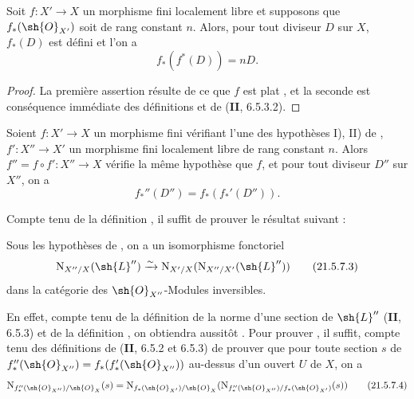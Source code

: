 \begin{proposition}[21.5.6]
\label{IV.21.5.6}
Soit $f:X'\to X$ un morphisme fini localement libre et supposons que $f_*(\sh{O}_{X'})$ soit de rang constant $n$.
Alors, pour tout diviseur $D$ sur $X$, $f_*(D)$ est défini et l'on a
\[
\label{IV.21.5.6.1}
  f_*(f^*(D))=nD.
  \tag{21.5.6.1}
\]
\end{proposition}

\begin{proof}
La première assertion résulte de ce que $f$ est plat , et la seconde est conséquence immédiate des définitions et de (\textbf{II}, 6.5.3.2).
\end{proof}

\begin{proposition}[21.5.7]
\label{IV.21.5.7}
Soient $f:X'\to X$ un morphisme fini vérifiant l'une des hypothèses \textup{I), II)} de , $f':X''\to X'$ un morphisme fini localement libre de rang constant $n$.
Alors $f''=f\circ f':X''\to X$ vérifie la même hypothèse que $f$, et pour tout diviseur $D''$ sur $X''$, on a
\[
\label{IV.21.5.7.1}
  f_*''(D'')=f_*(f_*'(D'')).
  \tag{21.5.7.1}
\]
\end{proposition}

Compte tenu de la définition , il suffit de prouver le résultat suivant :

\begin{lemma}[21.5.7.2]
\label{IV.21.5.7.2}
Sous les hypothèses de , on a un isomorphisme fonctoriel
\[
\label{IV.21.5.7.3}
  \mathrm{N}_{X''/X}(\sh{L}'')\xrightarrow{\sim}\mathrm{N}_{X'/X}(\mathrm{N}_{X''/X'}(\sh{L}''))
  \tag{21.5.7.3}
\]
dans la catégorie des $\sh{O}_{X''}$-Modules inversibles.
\end{lemma}

En effet, compte tenu de la définition de la norme d'une section de $\sh{L}''$ (\textbf{II}, 6.5.3) et de la définition , on obtiendra aussitôt .
Pour prouver , il suffit, compte tenu des définitions de (\textbf{II}, 6.5.2 et 6.5.3) de prouver que pour toute section $s$ de $f_*''(\sh{O}_{X''})=f_*(f_*'(\sh{O}_{X''}))$ au-dessus d'un ouvert $U$ de $X$, on a
\[
\label{IV.21.5.7.4}
  \mathrm{N}_{f_*''(\sh{O}_{X''})/\sh{O}_X}(s)=\mathrm{N}_{f_*(\sh{O}_{X'})/\sh{O}_X}(\mathrm{N}_{f_*''(\sh{O}_{X''})/f_*(\sh{O}_{X'})}(s))
  \tag{21.5.7.4}
\]


